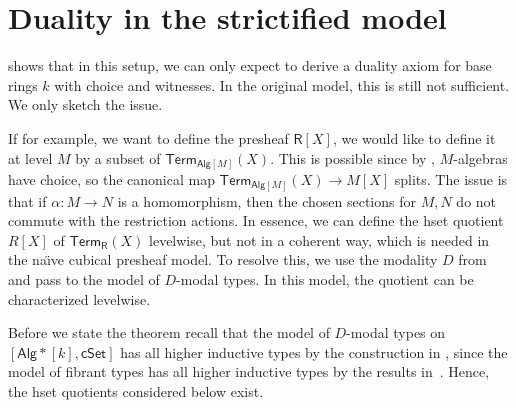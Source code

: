 \documentclass[10pt,a4paper]{article}
\theoremstyle{definition}
\theoremstyle{remark}
\newcommand{\cSet}{\mathsf{cSet}}
\newcommand{\Alg}{\mathsf{Alg}}
\newcommand\R{\mathsf{R}}
\newcommand\Term{\mathsf{Term}}
\begin{document}
\section{Duality in the strictified model}\label{sec:duality-in-model-of-modal-types}

 shows that in this setup, we can only expect to derive a duality axiom for base rings \(k\) with choice and witnesses.
In the original model, this is still not sufficient.
We only sketch the issue.

If for example, we want to define the presheaf \(\R[X]\), we would like to define it at level \(M\) by a subset of \(\Term_{\Alg[M]}(X)\).
This is possible since by , \(M\)-algebras have choice, so the canonical map \(\Term_{\Alg[M]}(X) \to M[X]\) splits.
The issue is that if \(\alpha \colon M \to N\) is a homomorphism, then the chosen sections for \(M, N\) do not commute with the restriction actions.
In essence, we can define the hset quotient \(R[X]\) of \(\Term_{\R}(X)\) levelwise, but not in a coherent way, which is needed in the na{\"\i}ve cubical presheaf model.
To resolve this, we use the modality \(D\) from~\cite{CRS21} and pass to the model of \(D\)-modal types.
In this model, the quotient can be characterized levelwise.

Before we state the theorem recall that the model of \(D\)-modal types on \([\Alg*[k], \cSet]\) has all higher inductive types by the construction in \cite{CRS21}, since the model of fibrant types has all higher inductive types by the results in~\cite{CoquandHM18}.
Hence, the hset quotients considered below exist.
\end{document}

